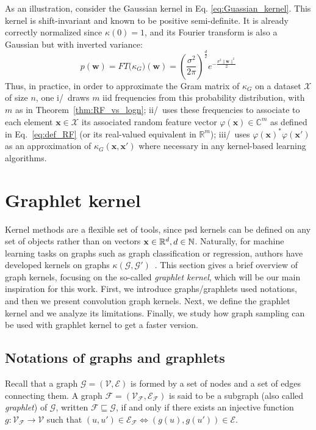 As an illustration, consider the Gaussian kernel in Eq. \ref{eq:Guassian_kernel}. This kernel is shift-invariant and known to be positive semi-definite. It is already correctly normalized since $\kappa(0) = 1$, and its Fourier transform is also a Gaussian but with inverted variance:
\begin{equation}
\label{eq:G_fourier}
    p(\mathbf{w})=FT\big(\kappa_G\big)(\mathbf{w})=\left(\frac{\sigma^2}{2\pi}\right)^\frac{d}{2}e^{-\frac{\sigma^2\|\mathbf{w}\|^2}{2}}
\end{equation}
Thus, in practice, in order to approximate the Gram matrix of $\kappa_G$ on a dataset $\mathcal{X}$ of size $n$, one i/~draws $m$ iid frequencies from this probability distribution, with $m$ as in Theorem~\ref{thm:RF_vs_logn}; ii/~uses these frequencies to associate to each element $\mathbf{x}\in\mathcal{X}$ its associated random feature vector $\varphi(\mathbf{x})\in\mathbb{C}^m$ as defined in Eq.~\eqref{eq:def_RF}  (or its real-valued equivalent in $\mathbb{R}^m$); iii/~uses $\varphi(\mathbf{x})^*\varphi(\mathbf{x}')$ as an approximation of $\kappa_G(\mathbf{x},\mathbf{x}')$ where necessary in any kernel-based learning algorithms.

\section{Graphlet kernel}
Kernel methods are a flexible set of tools, since psd kernels can be defined on any set of objects rather than on vectors $\mathbf{x}\in \mathbb{R}^d, d\in \mathbb{N}$. Naturally, for machine learning tasks on graphs such as graph classification or regression, authors have developed kernels on graphs $\kappa(\mathcal{G},\mathcal{G}')$~\citep{kriege_graph_kernels}. This section gives a brief overview of graph kernels, focusing on the so-called \emph{graphlet kernel}, which will be our main inspiration for this work. First, we introduce graphs/graphlets used notations, and then we present convolution graph kernels. Next, we define the graphlet kernel and we analyze its limitations. Finally, we study how graph sampling can be used with graphlet kernel to get a faster version.

\subsection{Notations of graphs and graphlets}
Recall that a graph $\mathcal{G} = (\mathcal{V}, \mathcal{E})$ is formed by a set of nodes and a set of edges connecting them. A graph $\mathcal{F}=(\mathcal{V}_\mathcal{F},\mathcal{E}_\mathcal{F})$ is said to be a subgraph (also called \emph{graphlet}) of $\mathcal{G}$, written $\mathcal{F}\sqsubseteq \mathcal{G}$, if and only if there exists an injective function $g:\mathcal{V}_\mathcal{F}\xrightarrow{} \mathcal{V}$ such that $(u,u')\in \mathcal{E}_\mathcal{F} \Leftrightarrow{(g(u),g(u'))\in \mathcal{E}}$.

